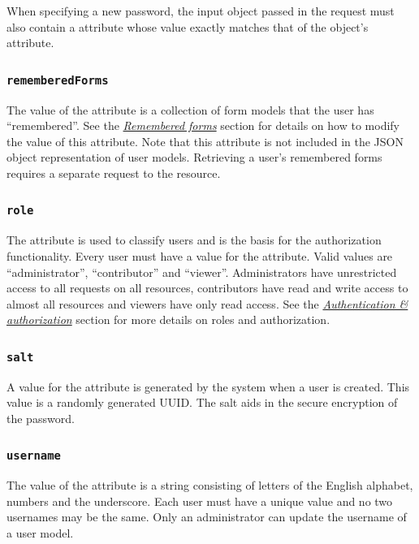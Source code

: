 \documentclass[letterpaper,10pt,english]{sphinxmanual}
\begin{document}
When specifying a new password, the input object passed in the request must also
contain a  attribute whose value exactly matches that of the
object's  attribute.


\subsubsection{\texttt{rememberedForms}}
\label{datastructure:rememberedforms}
The value of the  attribute is a collection of form models
that the user has ``remembered''.  See the {\hyperref[interface:remembered-forms-interface]{\emph{Remembered forms}}}
section for details on how to modify the value of this attribute.  Note that
this attribute is not included in the JSON object representation of user models.
Retrieving a user's remembered forms requires a separate request to the
 resource.


\subsubsection{\texttt{role}}
\label{datastructure:role}
The  attribute is used to classify users and is the basis for the
authorization functionality.  Every user must have a value for the 
attribute.  Valid values are ``administrator'', ``contributor'' and ``viewer''.
Administrators have unrestricted access to all requests on all resources,
contributors have read and write access to almost all resources and viewers have
only read access.  See the {\hyperref[interface:auth]{\emph{Authentication \& authorization}}} section for more details on roles and
authorization.


\subsubsection{\texttt{salt}}
\label{datastructure:salt}
A value for the  attribute is generated by the system when a user is
created.  This value is a randomly generated UUID.  The salt aids in the secure
encryption of the password.


\subsubsection{\texttt{username}}
\label{datastructure:username}
The value of the  attribute is a string consisting of letters of the
English alphabet, numbers and the underscore.  Each user must have a unique
 value and no two usernames may be the same.  Only an administrator
can update the username of a user model.
\end{document}
